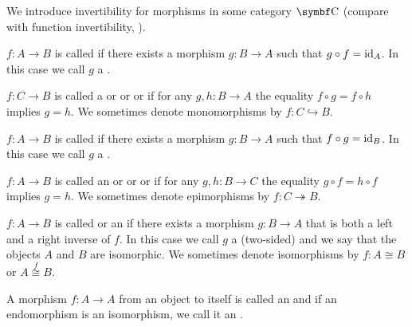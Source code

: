 \begin{definition}\label{def:morphism_invertibility}
  We introduce invertibility for morphisms in some category \( \Cat{C} \) (compare with function invertibility, ).

  \begin{defenum}
     \( f: A \to B \) is called  if there exists a morphism \( g: B \to A \) such that \( g \circ f = \operatorname{id}_A \). In this case we call \( g \) a .

     \( f: C \to B \) is called a  or  or  or  if for any \( g, h: B \to A \) the equality \( f \circ g = f \circ h \) implies \( g = h \). We sometimes denote monomorphisms by \( f: C \hookrightarrow B \).

     \( f: A \to B \) is called  if there exists a morphism \( g: B \to A \) such that \( f \circ g = \operatorname{id}_B \). In this case we call \( g \) a .

     \( f: A \to B \) is called an  or  or  or  if for any \( g, h: B \to C \) the equality \( g \circ f = h \circ f \) implies \( g = h \). We sometimes denote epimorphisms by \( f: C \twoheadrightarrow B \).

     \( f: A \to B \) is called  or an  if there exists a morphism \( g: B \to A \) that is both a left and a right inverse of \( f \). In this case we call \( g \) a (two-sided)  and we say that the objects \( A \) and \( B \) are isomorphic. We sometimes denote isomorphisms by \( f: A \cong B \) or \( A \overset f \cong B \). 

     A morphism \( f: A \to A \) from an object to itself is called an  and if an endomorphism is an isomorphism, we call it an .
  \end{defenum}
\end{definition}

